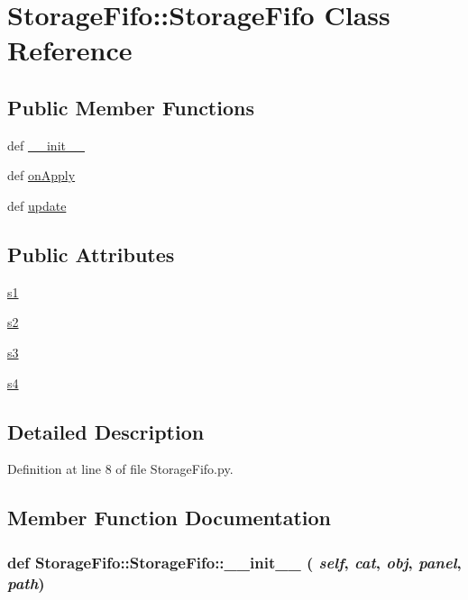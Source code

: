 \hypertarget{classStorageFifo_1_1StorageFifo}{
\section{StorageFifo::StorageFifo Class Reference}
\label{classStorageFifo_1_1StorageFifo}
}
\subsection*{Public Member Functions}
\begin{DoxyCompactItemize}
\item 
def \hyperlink{classStorageFifo_1_1StorageFifo_afb4e3e246f105da483ff50e7d4b85dcc}{\_\-\_\-init\_\-\_\-}
\item 
def \hyperlink{classStorageFifo_1_1StorageFifo_a59d0adc3c8c09e187ece685987fc501a}{onApply}
\item 
def \hyperlink{classStorageFifo_1_1StorageFifo_a0af6429cd37d03618907e91bf57928fb}{update}
\end{DoxyCompactItemize}
\subsection*{Public Attributes}
\begin{DoxyCompactItemize}
\item 
\hyperlink{classStorageFifo_1_1StorageFifo_ab27e4a7f4056b6e6b6c7b323d95eae6b}{s1}
\item 
\hyperlink{classStorageFifo_1_1StorageFifo_a652e937ce967ee77a0ab1179b0eb39d1}{s2}
\item 
\hyperlink{classStorageFifo_1_1StorageFifo_afe12db64baa102770551ba2a1e8cf1e7}{s3}
\item 
\hyperlink{classStorageFifo_1_1StorageFifo_a55e9317951aa785bd4404dfe90e9a74a}{s4}
\end{DoxyCompactItemize}


\subsection{Detailed Description}


Definition at line 8 of file StorageFifo.py.

\subsection{Member Function Documentation}
\hypertarget{classStorageFifo_1_1StorageFifo_afb4e3e246f105da483ff50e7d4b85dcc}{
\subsubsection[{\_\-\_\-init\_\-\_\-}]{\setlength{\rightskip}{0pt plus 5cm}def StorageFifo::StorageFifo::\_\-\_\-init\_\-\_\- ( {\em self}, \/   {\em cat}, \/   {\em obj}, \/   {\em panel}, \/   {\em path})}}
\label{classStorageFifo_1_1StorageFifo_afb4e3e246f105da483ff50e7d4b85dcc}


